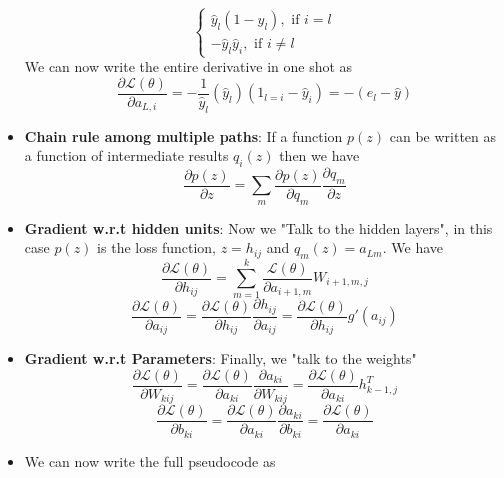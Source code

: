 \documentclass[a4paper]{article}
\begin{document}
\begin{itemize}
\begin{equation*}
\begin{cases}
            \hat{y}_l(1-\hat{y}_l),\text{ if }i= l\\
            -\hat{y}_l\hat{y}_i,\text{ if }i\neq l
        \end{cases}
    \end{equation*}
    We can now write the entire derivative in one shot as
    \begin{equation*}
        \frac{\partial \mathcal{L}(\theta)}{\partial a_{L,i}}=-\frac{1}{\hat{y}_l}(\hat{y}_l)(1_{l=i}-\hat{y}_i)=-(e_l-\hat{y})
    \end{equation*}
    \item \textbf{Chain rule among multiple paths}: If a function $p(z)$ can be written as a function of intermediate results $q_i(z)$ then we have
    \begin{equation*}
        \frac{\partial p(z)}{\partial z}=\sum_m\frac{\partial p(z)}{\partial q_m}\frac{\partial q_m}{\partial z}
    \end{equation*}
    \item \textbf{Gradient w.r.t hidden units}: Now we "Talk to the hidden layers", in this case $p(z)$ is the loss function, $z=h_{ij}$ and $q_m(z)=a_{Lm}$. We have
    \begin{equation*}
        \frac{\partial \mathcal{L}(\theta)}{\partial h_{ij}}=\sum_{m=1}^k\frac{\mathcal{L}(\theta)}{\partial a_{i+1,m}}W_{i+1,m,j}
    \end{equation*}
    \begin{equation*}
        \frac{\partial \mathcal{L}(\theta)}{\partial a_{ij}}=\frac{\partial \mathcal{L}(\theta)}{\partial h_{ij}}\frac{\partial h_{ij}}{\partial a_{ij}}=\frac{\partial \mathcal{L}(\theta)}{\partial h_{ij}}g'(a_{ij})
    \end{equation*}
    \item \textbf{Gradient w.r.t Parameters}: Finally, we "talk to the weights"
    \begin{equation*}
        \frac{\partial \mathcal{L}(\theta)}{\partial W_{kij}}=\frac{\partial \mathcal{L}(\theta)}{\partial a_{ki}}\frac{\partial a_{ki}}{\partial W_{kij}}=\frac{\partial \mathcal{L}(\theta)}{\partial a_{ki}}h^T_{k-1,j}
    \end{equation*}
    \begin{equation*}
        \frac{\partial \mathcal{L}(\theta)}{\partial b_{ki}}=\frac{\partial \mathcal{L}(\theta)}{\partial a_{ki}}\frac{\partial a_{ki}}{\partial b_{ki}}=\frac{\partial \mathcal{L}(\theta)}{\partial a_{ki}}
    \end{equation*}
    \item We can now write the full pseudocode as

\end{itemize}
\end{document}
